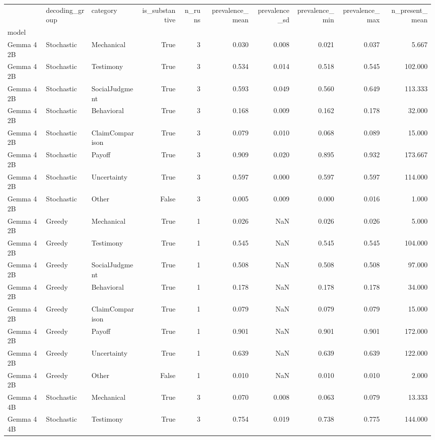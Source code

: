 \begin{tabular}{lllrrrrrrr}
\toprule
 & decoding\_group & category & is\_substantive & n\_runs & prevalence\_mean & prevalence\_sd & prevalence\_min & prevalence\_max & n\_present\_mean \\
model &  &  &  &  &  &  &  &  &  \\
\midrule
Gemma 4 2B & Stochastic & Mechanical & True & 3 & 0.030 & 0.008 & 0.021 & 0.037 & 5.667 \\
Gemma 4 2B & Stochastic & Testimony & True & 3 & 0.534 & 0.014 & 0.518 & 0.545 & 102.000 \\
Gemma 4 2B & Stochastic & SocialJudgment & True & 3 & 0.593 & 0.049 & 0.560 & 0.649 & 113.333 \\
Gemma 4 2B & Stochastic & Behavioral & True & 3 & 0.168 & 0.009 & 0.162 & 0.178 & 32.000 \\
Gemma 4 2B & Stochastic & ClaimComparison & True & 3 & 0.079 & 0.010 & 0.068 & 0.089 & 15.000 \\
Gemma 4 2B & Stochastic & Payoff & True & 3 & 0.909 & 0.020 & 0.895 & 0.932 & 173.667 \\
Gemma 4 2B & Stochastic & Uncertainty & True & 3 & 0.597 & 0.000 & 0.597 & 0.597 & 114.000 \\
Gemma 4 2B & Stochastic & Other & False & 3 & 0.005 & 0.009 & 0.000 & 0.016 & 1.000 \\
Gemma 4 2B & Greedy & Mechanical & True & 1 & 0.026 & NaN & 0.026 & 0.026 & 5.000 \\
Gemma 4 2B & Greedy & Testimony & True & 1 & 0.545 & NaN & 0.545 & 0.545 & 104.000 \\
Gemma 4 2B & Greedy & SocialJudgment & True & 1 & 0.508 & NaN & 0.508 & 0.508 & 97.000 \\
Gemma 4 2B & Greedy & Behavioral & True & 1 & 0.178 & NaN & 0.178 & 0.178 & 34.000 \\
Gemma 4 2B & Greedy & ClaimComparison & True & 1 & 0.079 & NaN & 0.079 & 0.079 & 15.000 \\
Gemma 4 2B & Greedy & Payoff & True & 1 & 0.901 & NaN & 0.901 & 0.901 & 172.000 \\
Gemma 4 2B & Greedy & Uncertainty & True & 1 & 0.639 & NaN & 0.639 & 0.639 & 122.000 \\
Gemma 4 2B & Greedy & Other & False & 1 & 0.010 & NaN & 0.010 & 0.010 & 2.000 \\
Gemma 4 4B & Stochastic & Mechanical & True & 3 & 0.070 & 0.008 & 0.063 & 0.079 & 13.333 \\
Gemma 4 4B & Stochastic & Testimony & True & 3 & 0.754 & 0.019 & 0.738 & 0.775 & 144.000 \\

\end{tabular}

